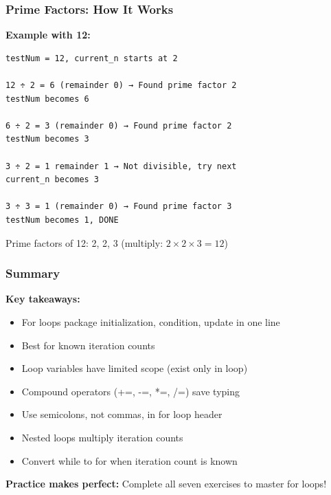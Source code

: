 \documentclass{beamer}
\begin{document}
\begin{frame}[fragile]
\frametitle{Prime Factors: How It Works}
\textbf{Example with 12:}
\begin{verbatim}
testNum = 12, current_n starts at 2

12 ÷ 2 = 6 (remainder 0) → Found prime factor 2
testNum becomes 6

6 ÷ 2 = 3 (remainder 0) → Found prime factor 2
testNum becomes 3

3 ÷ 2 = 1 remainder 1 → Not divisible, try next
current_n becomes 3

3 ÷ 3 = 1 (remainder 0) → Found prime factor 3
testNum becomes 1, DONE
\end{verbatim}

Prime factors of 12: 2, 2, 3 (multiply: $2 \times 2 \times 3 = 12$)
\end{frame}

\begin{frame}
\frametitle{Summary}
\textbf{Key takeaways:}
\begin{itemize}
\item For loops package initialization, condition, update in one line
\item Best for known iteration counts
\item Loop variables have limited scope (exist only in loop)
\item Compound operators (+=, -=, *=, /=) save typing
\item Use semicolons, not commas, in for loop header
\item Nested loops multiply iteration counts
\item Convert while to for when iteration count is known
\end{itemize}
\pause

\textbf{Practice makes perfect:} Complete all seven exercises to master for loops!
\end{frame}
\end{document}
